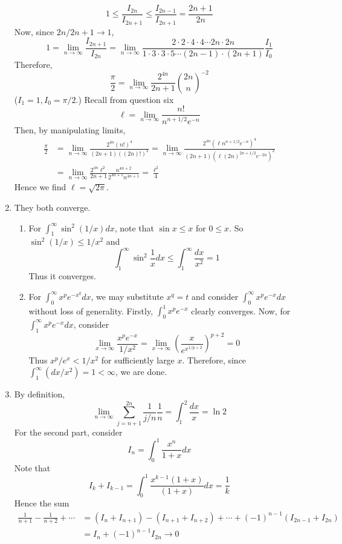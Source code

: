\documentclass[10pt, a4paper, twoside]{report}
\begin{document}
\begin{enumerate}[{1.}]
    \[1\leq\frac{I_{2n}}{I_{2n+1}}\leq\frac{I_{2n-1}}{I_{2n+1}}=\frac{2n+1}{2n}\]
    Now, since \(2n/2n+1\to 1\), 
    \[1=\lim_{n\to\infty}\frac{I_{2n+1}}{I_{2n}}=\lim_{n\to\infty}\frac{2\cdot 2\cdot 4\cdot 4\cdots 2n\cdot 2n}{1\cdot 3\cdot 3\cdot 5\cdots(2n-1)\cdot(2n+1)}\frac{I_1}{I_0}\]
    Therefore,
    \[\frac{\pi}2=\lim_{n\to\infty}\frac{2^{4n}}{2n+1}{\binom{2n}n}^{-2}\]
    (\(I_1=1,I_0=\pi/2\).) 
    Recall from question six 
    \[\ell=\lim_{n\to\infty}\frac{n!}{n^{n+1/2}e^{-n}}\]
    Then, by manipulating limits,
    \begin{align*}
        \frac{\pi}2&=\lim_{n\to\infty}\frac{2^{4n}(n!)^4}{(2n+1)((2n)!)^2}=\lim_{n\to\infty}\frac{2^{4n}(\ell n^{n+1/2}e^{-n})^4}{(2n+1)(\ell(2n)^{2n+1/2}e^{-2n})^2} \\
        &=\lim_{n\to\infty}\frac{2^{4n}\ell^2}{2n+1}\frac{n^{4n+2}}{2^{4n+1}n^{4n+1}}=\frac{\ell^2}{4}
    \end{align*}
    Hence we find \(\ell=\sqrt{2\pi}\).
    \item They both converge.
    \begin{enumerate}
        \item For \(\int_1^\infty\sin^2(1/x)dx\), note that \(\sin x\leq x\) for \(0\leq x\). So \(\sin^2(1/x)\leq 1/x^2\) and 
        \[\int_{1}^\infty\sin^2\frac 1xdx\leq\int_1^\infty\frac{dx}{x^2}=1\]
        Thus it converges.
        \item For \(\int_0^\infty x^pe^{-x^q}dx\), we may substitute \(x^q=t\) and consider \(\int_0^\infty x^pe^{-x}dx\) without loss of generality. Firstly, \(\int_0^1x^pe^{-x}\) clearly converges. Now, for \(\int_1^\infty x^pe^{-x}dx\), consider 
        \[\lim_{x\to\infty}\frac{x^pe^{-x}}{1/x^2}=\lim_{x\to\infty}\left(\frac{x}{e^{x^{1/p+2}}}\right)^{p+2}=0\]
        Thus \(x^p/e^x<1/x^2\) for sufficiently large \(x\). Therefore, since \(\int_1^\infty(dx/x^2)=1<\infty\), we are done.
    \end{enumerate}
    \item By definition,
    \[\lim_{n\to\infty}\sum_{j=n+1}^{2n}\frac{1}{j/n}\frac 1n=\int_1^2\frac{dx}{x}=\ln 2\]
    For the second part, consider 
    \[I_n=\int_0^1\frac{x^n}{1+x}dx\]
    Note that 
    \[I_k+I_{k-1}=\int_0^1\frac{x^{k-1}(1+x)}{(1+x)}dx=\frac 1k\]
    Hence the sum
    \begin{align*}
        \frac{1}{n+1}-\frac 1{n+2}+\cdots&=(I_n+I_{n+1})-(I_{n+1}+I_{n+2})+\cdots+(-1)^{n-1}(I_{2n-1}+I_{2n}) \\
        &=I_n+(-1)^{n-1}I_{2n}\to 0
    \end{align*}

\end{enumerate}
\end{document}
